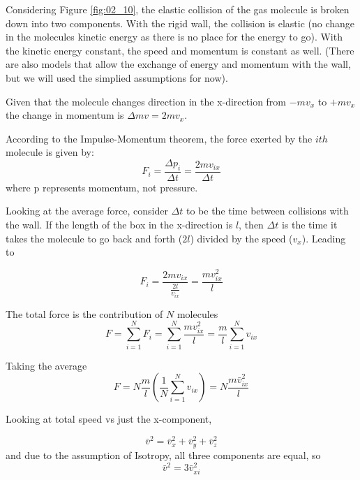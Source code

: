 \documentclass[14pt]{memoir}
\begin{document}
Considering Figure \ref{fig:02_10}, the elastic collision of the gas molecule is broken down into two components. With the rigid wall, the collision is elastic (no change in the molecules kinetic energy as there is no place for the energy to go). With the kinetic energy constant, the speed and momentum is constant as well. (There are also models that allow the exchange of energy and momentum with the wall, but we will used the simplied assumptions for now).

Given that the molecule changes direction in the x-direction from $-mv_x$ to $+mv_x$ the change in momentum is $\Delta mv = 2 m v_x$. 

According to the Impulse-Momentum theorem, the force exerted by the $ith$ molecule is given by:
\begin{equation}
F_i = \frac{\Delta p_i}{\Delta t} = \frac{2 m v_{ix}}{\Delta t}
\end{equation}
where p represents momentum, not pressure. 

Looking at the average force, consider $\Delta t$ to be the time between collisions with the wall. If the length of the box in the x-direction is $l$, then $\Delta t$ is the time it takes the molecule to go back and forth ($2l$) divided by the speed ($v_x$). Leading to

\begin{equation}
F_i = \frac{2 m v_{ix}}{\frac{2l}{v_{ix}}} = \frac{m v_{ix}^2}{l}
\end{equation}

The total force is the contribution of $N$ molecules
\begin{equation}
F = \sum_{i=1}^N F_i = \sum_{i=1}^N \frac{m v_{ix}^2}{l} = \frac{m}{l} \sum_{i=1}^N  v_{ix}
\end{equation}

Taking the average
\begin{equation}
F = N \frac{m}{l} (\frac{1}{N} \sum_{i=1}^N   v_{ix}) = N \frac{m \bar{v}_{ix}^2}{l}
\end{equation}


Looking at total speed vs just the x-component,

\begin{equation}
\bar{v}^2 = \bar{v}_{x}^2 + \bar{v}_{y}^2 + \bar{v}_{z}^2
\end{equation}
and due to the assumption of Isotropy, all three components are equal, so
\begin{equation}
\bar{v}^2 = 3 \bar{v}_{xi}^2
\end{equation}
\end{document}
